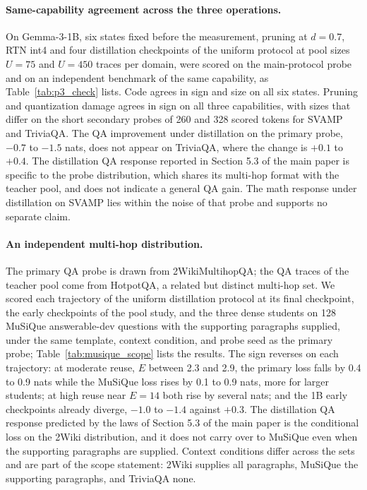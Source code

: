 \paragraph{Same-capability agreement across the three operations.} On
Gemma-3-1B, six states fixed before the measurement, pruning at $d=0.7$, RTN int4 and four distillation checkpoints of the uniform protocol at pool sizes $U=75$ and $U=450$ traces per domain, were scored on the main-protocol probe
and on an independent benchmark of the same capability, as Table~\ref{tab:p3_check} lists. Code agrees in sign and size on all six
states. Pruning and quantization damage agrees in sign on all three
capabilities, with sizes that differ on the short secondary probes of 260 and 328 scored tokens for SVAMP and TriviaQA. The QA improvement
under distillation on the primary probe, $-0.7$ to $-1.5$ nats, does not appear on TriviaQA, where the change is $+0.1$ to $+0.4$. The distillation QA
response reported in Section 5.3 of the main paper is specific to the
probe distribution, which shares its multi-hop format with the teacher
pool, and does not indicate a general QA gain. The math response
under distillation on SVAMP lies within the noise of that probe and supports no separate claim.


\paragraph{An independent multi-hop distribution.} The primary QA
probe is drawn from 2WikiMultihopQA; the QA traces of the teacher pool come
from HotpotQA, a related but distinct multi-hop set. We scored each trajectory
of the uniform distillation protocol at its final checkpoint, the
early checkpoints of the pool study, and the three dense students on 128 MuSiQue
answerable-dev questions \citep{trivedi2022musique} with the
supporting paragraphs supplied, under the same template, context
condition, and probe seed as the primary probe; Table~\ref{tab:musique_scope} lists the results. The sign reverses on each trajectory:
at moderate reuse, $E$ between 2.3 and 2.9, the primary loss falls by 0.4 to
0.9 nats while the MuSiQue loss rises by 0.1 to 0.9 nats, more for
larger students; at high reuse near $E=14$ both rise by several
nats; and the 1B early checkpoints already diverge, $-1.0$ to $-1.4$ against $+0.3$. The distillation QA response predicted by the laws of
Section 5.3 of the main paper is the conditional loss on the 2Wiki
distribution, and it does not carry over to MuSiQue even when the
supporting paragraphs are supplied. Context
conditions differ across the sets and are part of the scope statement:
2Wiki supplies all paragraphs, MuSiQue the supporting paragraphs, and
TriviaQA none.


